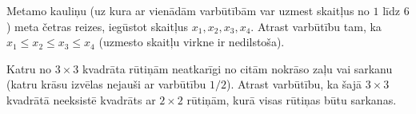 \documentclass[a4paper,12pt]{article}
\begin{document}
\vspace{10pt}
\begin{problem}
Metamo kauliņu (uz kura ar vienādām varbūtībām var uzmest skaitļus no $1$ līdz $6$) 
meta četras reizes, iegūstot skaitļus $x_1, x_2, x_3, x_4$. 
Atrast varbūtību tam, ka $x_1 \leq x_2 \leq x_3 \leq x_4$ (uzmesto skaitļu virkne
ir nedilstoša). 
\end{problem}




\vspace{10pt}
\begin{problem}
Katru no $3 \times 3$ kvadrāta rūtiņām neatkarīgi no citām 
nokrāso zaļu vai sarkanu (katru krāsu izvēlas nejauši 
ar varbūtību $1/2$). Atrast varbūtību, ka šajā $3 \times 3$ kvadrātā neeksistē 
kvadrāts ar $2 \times 2$ rūtiņām, kurā visas rūtiņas būtu sarkanas.
\end{problem}
\end{document}
